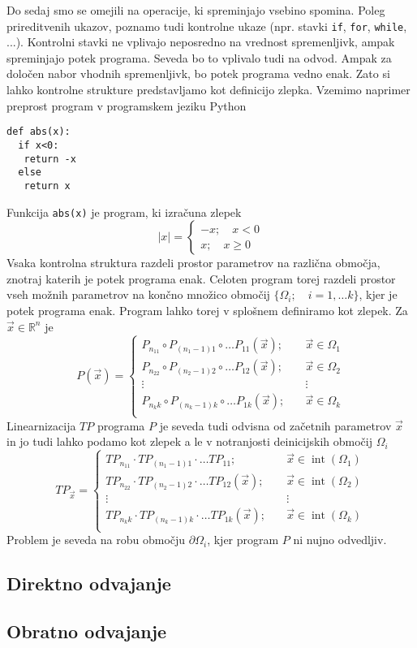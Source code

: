 \documentclass{article}
\newcommand{\RR}{\mathbb{R}}
\DeclareMathOperator{\interior}{int}
\begin{document}
Do sedaj smo se omejili na operacije, ki spreminjajo vsebino spomina. Poleg
prireditvenih ukazov, poznamo tudi kontrolne ukaze (npr. stavki \texttt{if},
\texttt{for}, \texttt{while}, ...). Kontrolni stavki ne vplivajo neposredno na
vrednost spremenljivk, ampak spreminjajo potek programa. Seveda bo to vplivalo
tudi na odvod. Ampak za določen nabor vhodnih spremenljivk, bo potek programa
vedno enak. Zato si lahko kontrolne strukture predstavljamo kot definicijo
zlepka. Vzemimo naprimer preprost program v programskem jeziku Python
\begin{verbatim}
def abs(x):
  if x<0:
   return -x
  else
   return x
\end{verbatim}
Funkcija \texttt{abs(x)} je program, ki izračuna zlepek
\begin{equation}
  \label{eq:zlepek}
  |x| =
  \begin{cases}
    -x;\quad x<0\\
    x;\quad x\ge 0
  \end{cases}
\end{equation}
Vsaka kontrolna struktura razdeli prostor parametrov na različna območja,
znotraj katerih je potek programa enak. Celoten program torej razdeli prostor
vseh možnih parametrov na končno množico območij $\{\Omega_i;\quad i=1,\ldots
k\}$, kjer je potek programa enak. Program lahko torej v splošnem definiramo kot
zlepek. Za $\vec{x}\in\RR^n$ je
\begin{equation}
  \label{eq:zlrprk_splosno}
  P(\vec{x}) =
  \begin{cases}
    P_{n_11}\circ P_{(n_1-1)1}\circ\ldots P_{11}(\vec{x});&\quad \vec{x}\in\Omega_1\\
    P_{n_22}\circ P_{(n_2-1)2}\circ\ldots P_{12}(\vec{x});&\quad \vec{x}\in\Omega_2\\
    \vdots&\quad\vdots\\
    P_{n_kk}\circ P_{(n_k-1)k}\circ\ldots P_{1k}(\vec{x});&\quad \vec{x}\in\Omega_k\\
  \end{cases}
\end{equation}
Linearnizacija $TP$ programa $P$ je seveda tudi odvisna od začetnih parametrov
$\vec{x}$ in jo tudi lahko podamo kot zlepek a le v notranjosti deinicijskih območij $\Omega_i$
\begin{equation}
  \label{eq:zlrprk_splosno}
  TP_{\vec{x}} =
  \begin{cases}
    TP_{n_11}\cdot TP_{(n_1-1)1}\cdot\ldots TP_{11};&\quad \vec{x}\in\interior(\Omega_1)\\
    TP_{n_22}\cdot TP_{(n_2-1)2}\cdot\ldots TP_{12}(\vec{x});&\quad \vec{x}\in\interior(\Omega_2)\\
    \vdots&\quad\vdots\\
    TP_{n_kk}\cdot TP_{(n_k-1)k}\cdot\ldots TP_{1k}(\vec{x});&\quad \vec{x}\in\interior(\Omega_k)\\
  \end{cases}
\end{equation}
Problem je seveda na robu območju $\partial\Omega_i$, kjer program $P$ ni nujno odvedljiv.
\subsection{Direktno odvajanje}
\subsection{Obratno odvajanje}
\end{document}
